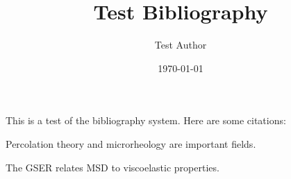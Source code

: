 \documentclass[12pt]{article}
\begin{document}
\title{Test Bibliography}
\author{Test Author}
\date{\today}
\maketitle

This is a test of the bibliography system. Here are some citations:

Percolation theory \cite{Stauffer1992} and microrheology \cite{Mason1995} are important fields.

The GSER \cite{Mason2000} relates MSD to viscoelastic properties.



\end{document}

